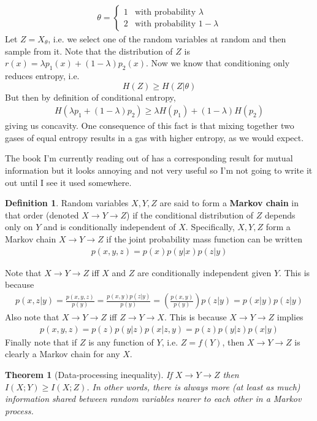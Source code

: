 \documentclass{article}
\theoremstyle{definition}
\newtheorem{definition}{Definition}[section]
\theoremstyle{plain}
\newtheorem{theorem}{Theorem}[section]
\begin{document}
\begin{align}
	\theta = \begin{cases}
		1 & \textrm{with probability } \lambda \\
		2 & \textrm{with probability } 1-\lambda
	\end{cases}
\end{align}
Let $Z = X_{\theta}$, i.e. we select one of the random variables at random and then sample from it. Note that the distribution of $Z$ is $r(x) = \lambda p_1(x) + (1-\lambda)p_2(x)$. Now we know that conditioning only reduces entropy, i.e.
  \[ H(Z) \geq H(Z|\theta) \]
But then by definition of conditional entropy,
\begin{align}
	H(\lambda p_1 + (1-\lambda)p_2) \geq \lambda H(p_1) + (1-\lambda)H(p_2)
\end{align}
giving us concavity. One consequence of this fact is that mixing together two gases of equal entropy results in a gas with higher entropy, as we would expect. \par 
	The book I'm currently reading out of has a corresponding result for mutual information but it looks annoying and not very useful so I'm not going to write it out until I see it used somewhere. 
\begin{definition}
	Random variables $X,Y,Z$ are said to form a \textbf{Markov chain} in that order (denoted $X \to Y \to Z$) if the conditional distribution of $Z$ depends only on $Y$ and is conditionally independent of $X$. Specifically, $X,Y,Z$ form a Markov chain $X \to Y \to Z$ if the joint probability mass function can be written
	\begin{align}
		p(x,y,z) = p(x)p(y|x)p(z|y)
	\end{align}
\end{definition}
Note that $X \to Y \to Z$ iff $X$ and $Z$ are conditionally independent given $Y$. This is because
\begin{align}
	p(x,z|y) = \frac{p(x,y,z)}{p(y)} = \frac{p(x,y)p(z|y)}{p(y)} = \left(\frac{p(x,y)}{p(y)}\right)p(z|y) = p(x|y)p(z|y)
\end{align} 
Also note that $X \to Y \to Z$ iff $Z \to Y \to X$. This is because $X \to Y \to Z$ implies
\begin{align}
	p(x,y,z) = p(z)p(y|z)p(x|z,y) = p(z)p(y|z)p(x|y)
\end{align}
Finally note that if $Z$ is any function of $Y$, i.e. $Z = f(Y)$, then $X \to Y \to Z$ is clearly a Markov chain for any $X$. 
\begin{theorem}[Data-processing inequality]
	If $X \to Y \to Z$ then $I(X;Y) \geq I(X;Z)$. In other words, there is always more (at least as much) information shared between random variables nearer to each other in a Markov process.
\end{theorem}
\end{document}
